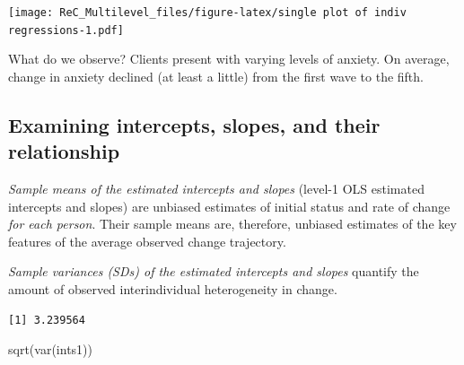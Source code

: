 \documentclass[
  english,
]{book}
\newenvironment{Shaded}{\begin{snugshade}}{\end{snugshade}}
\newcommand{\AttributeTok}[1]{\textcolor[rgb]{0.77,0.63,0.00}{#1}}
\newcommand{\CommentTok}[1]{\textcolor[rgb]{0.56,0.35,0.01}{\textit{#1}}}
\newcommand{\ConstantTok}[1]{\textcolor[rgb]{0.00,0.00,0.00}{#1}}
\newcommand{\ControlFlowTok}[1]{\textcolor[rgb]{0.13,0.29,0.53}{\textbf{#1}}}
\newcommand{\DecValTok}[1]{\textcolor[rgb]{0.00,0.00,0.81}{#1}}
\newcommand{\FunctionTok}[1]{\textcolor[rgb]{0.00,0.00,0.00}{#1}}
\newcommand{\NormalTok}[1]{#1}
\newcommand{\OtherTok}[1]{\textcolor[rgb]{0.56,0.35,0.01}{#1}}
\newcommand{\SpecialCharTok}[1]{\textcolor[rgb]{0.00,0.00,0.00}{#1}}
\begin{document}
\texttt{[image: ReC\_Multilevel\_files/figure-latex/single plot of indiv regressions-1.pdf]}

What do we observe? Clients present with varying levels of anxiety. On average, change in anxiety declined (at least a little) from the first wave to the fifth.

\hypertarget{examining-intercepts-slopes-and-their-relationship}{%
\subsection{Examining intercepts, slopes, and their relationship}\label{examining-intercepts-slopes-and-their-relationship}}

\emph{Sample means of the estimated intercepts and slopes} (level-1 OLS estimated intercepts and slopes) are unbiased estimates of initial status and rate of change \emph{for each person}. Their sample means are, therefore, unbiased estimates of the key features of the average observed change trajectory.

\emph{Sample variances (SDs) of the estimated intercepts and slopes} quantify the amount of observed interindividual heterogeneity in change.

\begin{Shaded}
\end{Shaded}

\begin{verbatim}
[1] 3.239564
\end{verbatim}

\begin{Shaded}
\begin{Highlighting}[]
\FunctionTok{sqrt}\NormalTok{(}\FunctionTok{var}\NormalTok{(ints1))}
\end{Highlighting}
\end{Shaded}
\end{document}
